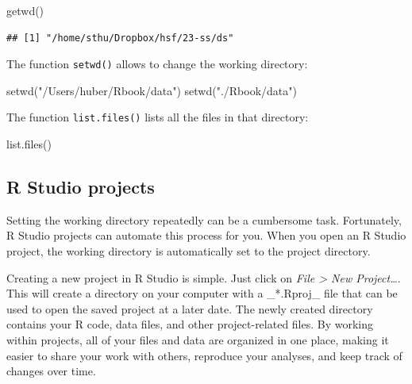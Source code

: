 \documentclass[
  12pt,
  oneside]{book}
\newenvironment{Shaded}{\begin{snugshade}}{\end{snugshade}}
\newcommand{\FunctionTok}[1]{\textcolor[rgb]{0.00,0.00,0.00}{#1}}
\newcommand{\NormalTok}[1]{#1}
\newcommand{\StringTok}[1]{\textcolor[rgb]{0.31,0.60,0.02}{#1}}
\theoremstyle{definition}
\theoremstyle{definition}
\theoremstyle{definition}
\theoremstyle{definition}
\theoremstyle{remark}
\begin{document}
\begin{Shaded}
\begin{Highlighting}[]
\FunctionTok{getwd}\NormalTok{()}
\end{Highlighting}
\end{Shaded}

\begin{verbatim}
## [1] "/home/sthu/Dropbox/hsf/23-ss/ds"
\end{verbatim}

The function \texttt{setwd()} allows to change the working directory:

\begin{Shaded}
\begin{Highlighting}[]
\FunctionTok{setwd}\NormalTok{(}\StringTok{"/Users/huber/Rbook/data"}\NormalTok{)}
\FunctionTok{setwd}\NormalTok{(}\StringTok{"./Rbook/data"}\NormalTok{)}
\end{Highlighting}
\end{Shaded}

The function \texttt{list.files()} lists all the files in that directory:

\begin{Shaded}
\begin{Highlighting}[]
\FunctionTok{list.files}\NormalTok{()}
\end{Highlighting}
\end{Shaded}

\hypertarget{sec:rstudioprojects}{%
\subsection{R Studio projects}\label{sec:rstudioprojects}}

Setting the working directory repeatedly can be a cumbersome task. Fortunately, R Studio projects can automate this process for you. When you open an R Studio project, the working directory is automatically set to the project directory.

Creating a new project in R Studio is simple. Just click on \emph{File \textgreater{} New Project\ldots{}}. This will create a directory on your computer with a \_*.Rproj\_ file that can be used to open the saved project at a later date. The newly created directory contains your R code, data files, and other project-related files. By working within projects, all of your files and data are organized in one place, making it easier to share your work with others, reproduce your analyses, and keep track of changes over time.
\end{document}
